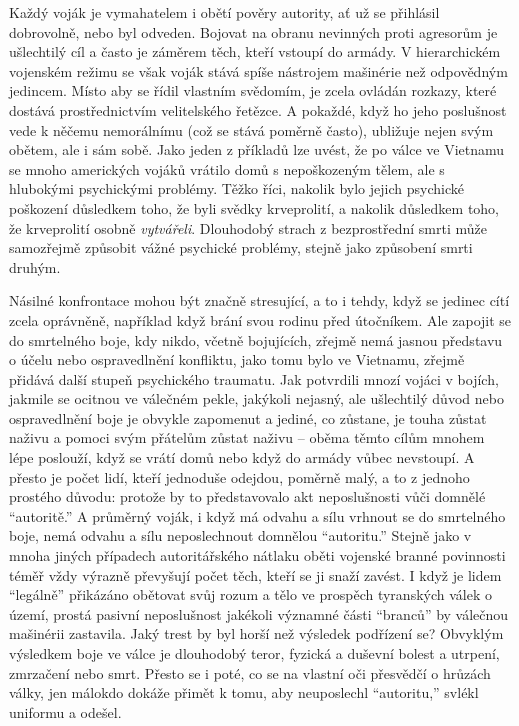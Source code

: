 \documentclass{book}
\begin{document}
Každý voják je vymahatelem i obětí pověry autority, ať už se přihlásil dobrovolně, nebo byl odveden. Bojovat na obranu nevinných proti agresorům je ušlechtilý cíl a často je záměrem těch, kteří vstoupí do armády. V hierarchickém vojenském režimu se však voják stává spíše nástrojem mašinérie než odpovědným jedincem. Místo aby se řídil vlastním svědomím, je zcela ovládán rozkazy, které dostává prostřednictvím velitelského řetězce. A pokaždé, když ho jeho poslušnost vede k něčemu nemorálnímu (což se stává poměrně často), ubližuje nejen svým obětem, ale i sám sobě. Jako jeden z příkladů lze uvést, že po válce ve Vietnamu se mnoho amerických vojáků vrátilo domů s nepoškozeným tělem, ale s hlubokými psychickými problémy. Těžko říci, nakolik bylo jejich psychické poškození důsledkem toho, že byli svědky krveprolití, a nakolik důsledkem toho, že krveprolití osobně \emph{vytvářeli}. Dlouhodobý strach z bezprostřední smrti může samozřejmě způsobit vážné psychické problémy, stejně jako způsobení smrti druhým.

Násilné konfrontace mohou být značně stresující, a to i tehdy, když se jedinec cítí zcela oprávněně, například když brání svou rodinu před útočníkem. Ale zapojit se do smrtelného boje, kdy nikdo, včetně bojujících, zřejmě nemá jasnou představu o účelu nebo ospravedlnění konfliktu, jako tomu bylo ve Vietnamu, zřejmě přidává další stupeň psychického traumatu. Jak potvrdili mnozí vojáci v bojích, jakmile se ocitnou ve válečném pekle, jakýkoli nejasný, ale ušlechtilý důvod nebo ospravedlnění boje je obvykle zapomenut a jediné, co zůstane, je touha zůstat naživu a pomoci svým přátelům zůstat naživu -- oběma těmto cílům mnohem lépe poslouží, když se vrátí domů nebo když do armády vůbec nevstoupí. A přesto je počet lidí, kteří jednoduše odejdou, poměrně malý, a to z jednoho prostého důvodu: protože by to představovalo akt neposlušnosti vůči domnělé \enquote{autoritě.} A průměrný voják, i když má odvahu a sílu vrhnout se do smrtelného boje, nemá odvahu a sílu neposlechnout domnělou \enquote{autoritu.} Stejně jako v mnoha jiných případech autoritářského nátlaku oběti vojenské branné povinnosti téměř vždy výrazně převyšují počet těch, kteří se ji snaží zavést. I když je lidem \enquote{legálně} přikázáno obětovat svůj rozum a tělo ve prospěch tyranských válek o území, prostá pasivní neposlušnost jakékoli významné části \enquote{branců} by válečnou mašinérii zastavila. Jaký trest by byl horší než výsledek podřízení se? Obvyklým výsledkem boje ve válce je dlouhodobý teror, fyzická a duševní bolest a utrpení, zmrzačení nebo smrt. Přesto se i poté, co se na vlastní oči přesvědčí o hrůzách války, jen málokdo dokáže přimět k tomu, aby neuposlechl \enquote{autoritu,} svlékl uniformu a odešel.
\end{document}
